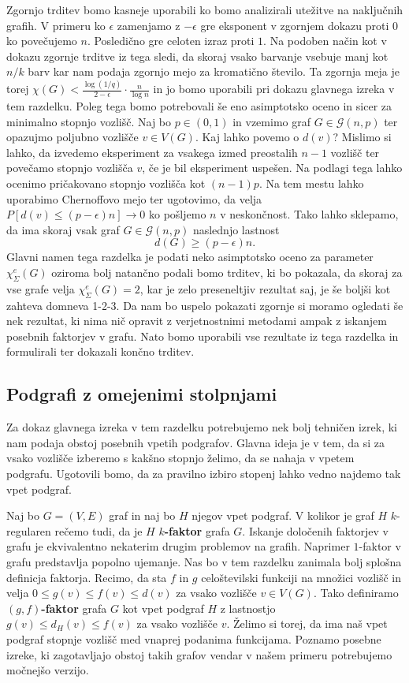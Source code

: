 \documentclass[12pt,a4paper,twoside]{article}
\theoremstyle{definition} %
\theoremstyle{plain} %
\newcommand{\ec}{\chi_{\Sigma}^e}
\numberwithin{equation}{section}  %
\begin{document}
Zgornjo trditev bomo kasneje uporabili ko bomo analizirali utežitve na naključnih grafih. V primeru ko $\epsilon$ zamenjamo z $-\epsilon$ gre eksponent v zgornjem dokazu proti $0$ ko povečujemo $n$. Posledično gre celoten izraz proti $1$. Na podoben način kot v dokazu zgornje trditve iz tega sledi, da skoraj vsako barvanje vsebuje manj kot $n/k$ barv kar nam podaja zgornjo mejo za kromatično število. Ta zgornja meja je torej $\chi(G) < \frac{\log(1/q)}{2 - \epsilon} \cdot \frac{n}{\log n}$ in jo bomo uporabili pri dokazu glavnega izreka v tem razdelku. Poleg tega bomo potrebovali še eno asimptotsko oceno in sicer za minimalno stopnjo vozlišč. Naj bo $p \in (0, 1)$ in vzemimo graf $G \in  \mathcal{G}(n, p)$ ter opazujmo poljubno vozlišče $v \in V(G)$. Kaj lahko povemo o $d(v)$? Mislimo si lahko, da izvedemo eksperiment za vsakega izmed preostalih $n - 1$ vozlišč ter povečamo stopnjo vozlišča $v$, če je bil eksperiment uspešen. Na podlagi tega lahko ocenimo pričakovano stopnjo vozlišča kot $(n-1)p$. Na tem mestu lahko uporabimo Chernoffovo mejo ter ugotovimo, da velja $P[d(v) \le (p - \epsilon)n] \rightarrow 0$ ko pošljemo $n$ v neskončnost. Tako lahko sklepamo, da ima skoraj vsak graf $G \in  \mathcal{G}(n, p)$ naslednjo lastnost
$$ d(G) \ge (p - \epsilon)n .$$
Glavni namen tega razdelka je podati neko asimptotsko oceno za parameter $\ec(G)$ oziroma bolj natančno podali bomo trditev, ki bo pokazala, da skoraj za vse grafe velja $\ec(G) = 2$, kar je zelo preseneltjiv rezultat saj, je še boljši kot zahteva domneva 1-2-3. Da nam bo uspelo pokazati zgornje si moramo ogledati še nek rezultat, ki nima nič opravit z verjetnostnimi metodami ampak z iskanjem posebnih faktorjev v grafu. Nato bomo uporabili vse rezultate iz tega razdelka in formulirali ter dokazali končno trditev.

\subsection{Podgrafi z omejenimi stolpnjami}
Za dokaz glavnega izreka v tem razdelku potrebujemo nek bolj tehničen izrek, ki nam podaja obstoj posebnih vpetih podgrafov. Glavna ideja je v tem, da si za vsako vozlišče izberemo s kakšno stopnjo želimo, da se nahaja v vpetem podgrafu. Ugotovili bomo, da za pravilno izbiro stopenj lahko vedno najdemo tak vpet podgraf.


Naj bo $G =(V, E)$ graf in naj bo $H$ njegov vpet podgraf. V kolikor je graf $H$ $k$-regularen rečemo tudi, da je $H$ \textbf{$k$-faktor} grafa $G$.  Iskanje določenih faktorjev v grafu je ekvivalentno nekaterim drugim problemov na grafih. Naprimer $1$-faktor v grafu predstavlja popolno ujemanje. Nas bo v tem razdelku zanimala bolj splošna definicja faktorja.  Recimo, da sta $f$ in $g$ celoštevilski funkciji na množici vozlišč in velja $0 \le g(v) \le f(v) \le d(v)$ za vsako vozlišče $v \in V(G)$. Tako definiramo \textbf{$(g,f)$-faktor} grafa $G$ kot vpet podgraf $H$ z lastnostjo $g(v) \le d_H(v) \le f(v)$ za vsako vozlišče $v$. Želimo si torej, da ima naš vpet podgraf stopnje vozlišč med vnaprej podanima funkcijama. Poznamo posebne izreke, ki zagotavljajo obstoj takih grafov vendar v našem primeru potrebujemo močnejšo verzijo.
\end{document}
